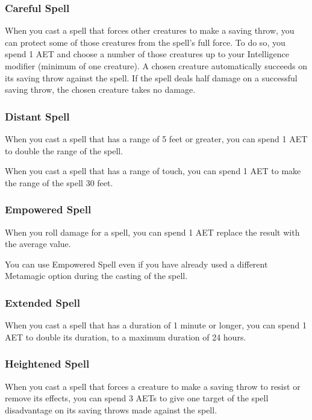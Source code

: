 \subsubsection{Careful Spell}

When you cast a spell that forces other creatures to make a saving throw, you can protect some of those creatures from the spell's full force. To do so, you spend 1 AET and choose a number of those creatures up to your Intelligence modifier (minimum of one creature). A chosen creature automatically succeeds on its saving throw against the spell. If the spell deals half damage on a successful saving throw, the chosen creature takes no damage.

\subsubsection{Distant Spell}

When you cast a spell that has a range of 5 feet or greater, you can spend 1 AET to double the range of the spell.

When you cast a spell that has a range of touch, you can spend 1 AET to make the range of the spell 30 feet.

\subsubsection{Empowered Spell}

When you roll damage for a spell, you can spend 1 AET replace the result with the average value.

You can use Empowered Spell even if you have already used a different Metamagic option during the casting of the spell.

\subsubsection{Extended Spell}

When you cast a spell that has a duration of 1 minute or longer, you can spend 1 AET to double its duration, to a maximum duration of 24 hours.

\subsubsection{Heightened Spell}

When you cast a spell that forces a creature to make a saving throw to resist or remove its effects, you can spend 3 AETs to give one target of the spell disadvantage on its saving throws made against the spell.

